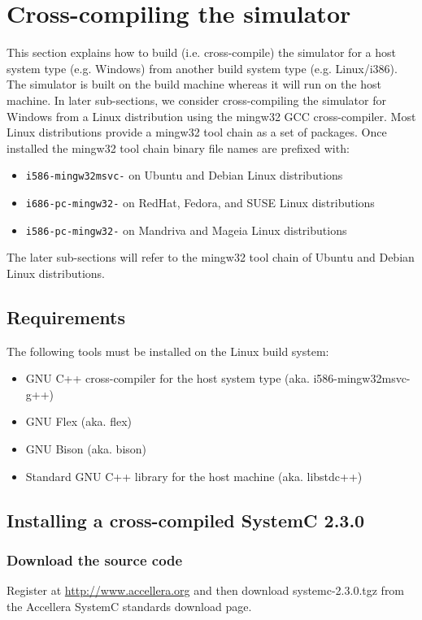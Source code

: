 \section{Cross-compiling the simulator}

This section explains how to build (i.e. cross-compile) the simulator for a host system type (e.g. Windows) from another build system type (e.g. Linux/i386).
The simulator is built on the build machine whereas it will run on the host machine.
In later sub-sections, we consider cross-compiling the simulator for Windows from a Linux distribution using the mingw32 GCC cross-compiler.
Most Linux distributions provide a mingw32 tool chain as a set of packages.
Once installed the mingw32 tool chain binary file names are prefixed with:
\begin{itemize}
\item \texttt{i586-mingw32msvc-} on Ubuntu and Debian Linux distributions
\item \texttt{i686-pc-mingw32-} on RedHat, Fedora, and SUSE Linux distributions
\item \texttt{i586-pc-mingw32-} on Mandriva and Mageia Linux distributions
\end{itemize}
The later sub-sections will refer to the mingw32 tool chain of Ubuntu and Debian Linux distributions.

\subsection{Requirements}

\noindent The following tools must be installed on the Linux build system:
\begin{itemize}
\item GNU C++ cross-compiler for the host system type (aka. i586-mingw32msvc-g++)
\item GNU Flex (aka. flex)
\item GNU Bison (aka. bison)
\item Standard GNU C++ library for the host machine (aka. libstdc++)
\end{itemize}

\subsection{Installing a cross-compiled SystemC 2.3.0}
\subsubsection{Download the source code}
Register at \url{http://www.accellera.org} and then download systemc-2.3.0.tgz from the Accellera SystemC standards download page.

